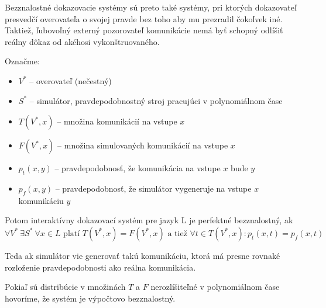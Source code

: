 Bezznalostné dokazovacie systémy sú preto také systémy, pri ktorých
dokazovateľ presvedčí overovateľa o svojej pravde bez toho aby mu
prezradil čokoľvek iné. Taktiež, ľubovoľný externý pozorovateľ
komunikácie nemá byť schopný odlíšiť reálny dôkaz od akéhosi
vykonštruovaného. 

\begin{definicia}

Označme:
\begin{itemize}
\itemsep -1.2mm
    \item $V^*$ -- overovateľ (nečestný)
    \item $S^*$ -- simulátor, pravdepodobnostný stroj pracujúci
        v polynomiálnom čase
    \item $T(V^*, x)$ -- množina komunikácií na vstupe $x$
    \item $F(V^*, x)$ -- množina simulovaných komunikácií na vstupe $x$
    \item $p_t(x,y)$ -- pravdepodobnosť, že komunikácia na vstupe $x$
            bude $y$
    \item $p_f(x,y)$ -- pravdepodobnosť, že simulátor vygeneruje na
            vstupe $x$ komunikáciu $y$
\end{itemize}

Potom interaktívny dokazovací systém pre jazyk L je perfektné bezznalostný,
ak 
\begin{equation*}
    \forall V^*\ \exists S^*\ \forall x \in L \mbox{ platí }
        T(V^*, x) = F(V^*, x) \mbox{ a tiež } 
        \forall t \in T(V^*,x) \colon p_t(x,t) = p_f(x,t)
\end{equation*}

Teda ak simulátor vie generovať takú komunikáciu, ktorá má presne rovnaké rozloženie
pravdepodobnosti ako reálna komunikácia.
\end{definicia}

\begin{poznamka}
Pokiaľ sú distribúcie v množinách $T$ a $F$ nerozlíšiteľné
v polynomiálnom čase hovoríme, že systém je výpočtovo bezznalostný.
\end{poznamka}



